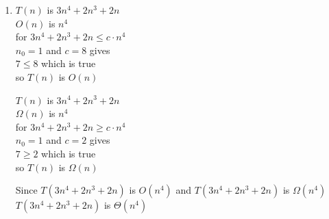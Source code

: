 \documentclass[11pt]{article}
\begin{document}
\begin{enumerate}[label=(\arabic*)\setlength{\listparindent}{\parindent}]
      \item $T(n)$ is $3n^4+2n^3+2n$\\
\vspace{5pt} 
$O(n)$ is $n^4$\\
\vspace{5pt} 
for $ 3n^4+2n^3+2n\leq c \cdot n^4$\\
\vspace{5pt} 
 $n_{0} = 1$ and $c = 8$ gives  \\
\vspace{5pt} 
$7 \leq 8$ which is true \\
\vspace{5pt} 
so $T(n)$ is $O(n)$\\
\begin{center}
\vspace{-135pt}
$T(n)$ is $3n^4+2n^3+2n$\\ 
\vspace{5pt} 
$\Omega(n)$ is $n^4$\\
\vspace{5pt} 
for $3n^4+2n^3+2n \geq c \cdot n^4$\\
\vspace{5pt} 
$n_{0} = 1$ and $c = 2$ gives  \\
\vspace{5pt} 
$7 \geq 2$ which is true \\
\vspace{5pt} 
so $T(n)$ is $\Omega(n)$\\
\end{center}

Since $T(3n^4+2n^3+2n)$ is $O(n^4)$ and $T(3n^4+2n^3+2n)$ is $\Omega(n^4)$ \\
\vspace{5pt}
$T(3n^4+2n^3+2n)$ is $\Theta(n^4)$

\noindent\makebox[\linewidth]{\rule{\paperwidth}{0.4pt}}


\end{enumerate}
\end{document}
